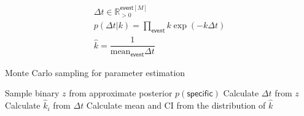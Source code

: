 \begin{gather*}
    \Delta t \in \mathbb{R}_{>0}^{\mathsf{event}[M]} \\
    p(\Delta t | k) = \prod_\mathsf{event} k \exp (- k \Delta t) \\
    \hat{k} = \dfrac{1}{\mathrm{mean}_{\mathsf{event}} \Delta t}
\end{gather*}

\begin{algorithm}
\caption{Monte Carlo sampling for parameter estimation}
\begin{algorithmic}[1]
    \State Sample binary $z$ from approximate posterior $p(\mathsf{specific})$
    \State Calculate $\Delta t$ from $z$
    \State Calculate $\hat{k}_i$ from $\Delta t$
\EndFor{}
\State Calculate mean and CI from the distribution of $\hat{k}$
\end{algorithmic}
\end{algorithm}